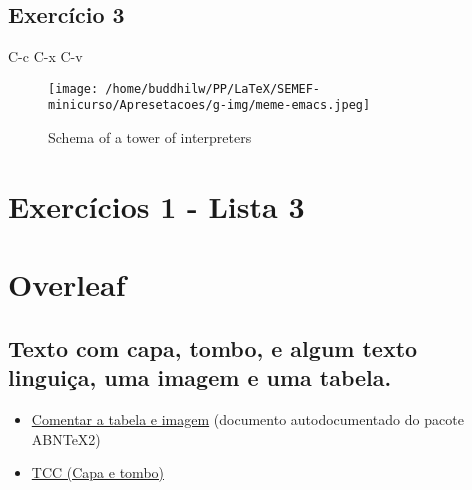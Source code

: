 \documentclass[11pt]{article}
\begin{document}
\begin{table}[htb]
\end{table}


\subsection{Exercício 3}
\label{sec:org9471364}

C-c C-x C-v

\begin{figure}[ht]
  \centering
  \caption{\label{fig:tower} Schema of a tower of interpreters}
  \texttt{[image: /home/buddhilw/PP/LaTeX/SEMEF-minicurso/Apresetacoes/g-img/meme-emacs.jpeg]}
  
\end{figure}



\section{Exercícios 1 - Lista 3}
\label{sec:orgb5a7f2d}
\section{Overleaf}
\label{sec:orgc748433}
\subsection{Texto com capa, tombo, e algum texto linguiça, uma imagem e uma tabela.}
\label{sec:org21f5099}
\begin{itemize}
\item \href{file:///home/buddhilw/PP/LaTeX/MC-LaTeX/LabEELw/LabEELw/MaterialMC/abnt\_modcanon/abntex2-modelo-include-comandos.tex}{Comentar a tabela e imagem} (documento autodocumentado do pacote ABNTeX2)
\item \href{TCC/TCC-en.tex}{TCC (Capa e tombo)}
\end{itemize}
\end{document}

